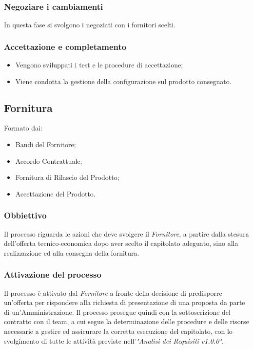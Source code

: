 \documentclass[12pt,a4paper,titlepage]{article}
\begin{document}
\subsubsection {Negoziare i cambiamenti}
	In questa fase si svolgono i negoziati con i fornitori scelti.
\subsubsection {Accettazione e completamento}
\begin {itemize}
	\item Vengono sviluppati i test e le procedure di accettazione;
	\item Viene condotta la gestione della configurazione sul prodotto consegnato.
\end {itemize} 
\subsection{Fornitura}
Formato dai:
\begin{itemize}
	\item Bandi del Fornitore;
	\item Accordo Contrattuale;
	\item Fornitura di Rilascio del Prodotto;
	\item Accettazione del Prodotto.
\end{itemize}
\subsubsection{Obbiettivo}
Il processo riguarda le azioni che deve svolgere il \textit{Fornitore}, a partire dalla stesura dell'offerta tecnico-economica dopo aver scelto il capitolato adeguato, sino alla realizzazione ed alla consegna della fornitura.
\subsubsection{Attivazione del processo}
Il processo è attivato dal \textit{Fornitore} a fronte della decisione di predisporre un'offerta per rispondere alla richiesta di presentazione di una proposta da parte di un'Amministrazione. Il processo prosegue quindi con la sottoscrizione del contratto con il team, a cui segue la determinazione delle procedure e delle risorse necessarie a gestire ed assicurare la corretta esecuzione del capitolato, con lo svolgimento di tutte le attività previste nell'\textit{"Analisi dei Requisiti v1.0.0"}.
\end{document}
